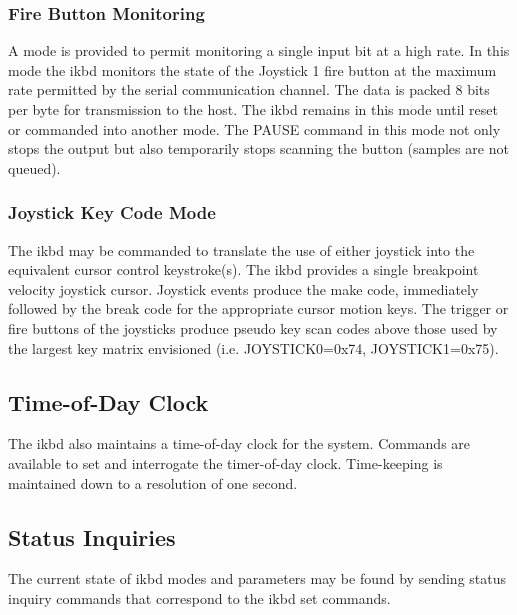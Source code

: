 \documentclass[a4paper,8pt,english]{sphinxmanual}
\begin{document}
\subsubsection{Fire Button Monitoring}
\label{input/devices/atarikbd:fire-button-monitoring}
A mode is provided to permit monitoring a single input bit at a high rate. In
this mode the ikbd monitors the state of the Joystick 1 fire button at the
maximum rate permitted by the serial communication channel. The data is packed
8 bits per byte for transmission to the host. The ikbd remains in this mode
until reset or commanded into another mode. The PAUSE command in this mode not
only stops the output but also temporarily stops scanning the button (samples
are not queued).


\subsubsection{Joystick Key Code Mode}
\label{input/devices/atarikbd:joystick-key-code-mode}
The ikbd may be commanded to translate the use of either joystick into the
equivalent cursor control keystroke(s). The ikbd provides a single breakpoint
velocity joystick cursor.
Joystick events produce the make code, immediately followed by the break code
for the appropriate cursor motion keys. The trigger or fire buttons of the
joysticks produce pseudo key scan codes above those used by the largest key
matrix envisioned (i.e. JOYSTICK0=0x74, JOYSTICK1=0x75).


\subsection{Time-of-Day Clock}
\label{input/devices/atarikbd:time-of-day-clock}
The ikbd also maintains a time-of-day clock for the system. Commands are
available to set and interrogate the timer-of-day clock. Time-keeping is
maintained down to a resolution of one second.


\subsection{Status Inquiries}
\label{input/devices/atarikbd:status-inquiries}
The current state of ikbd modes and parameters may be found by sending status
inquiry commands that correspond to the ikbd set commands.
\end{document}
